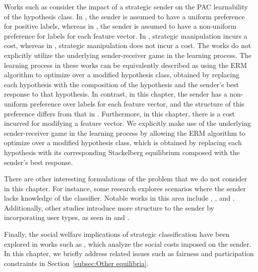 Works such as \cite{hardt2016strategic,cullina2018pac,zhang2021incentive,sundaram2021pac} consider the impact of a strategic sender on the PAC learnability of the hypothesis class. In \cite{hardt2016strategic,cullina2018pac,zhang2021incentive}, the sender is assumed to have a uniform preference for positive labels, whereas in \cite{sundaram2021pac}, the sender is assumed to have a non-uniform preference for labels for each feature vector. In \cite{hardt2016strategic,cullina2018pac,sundaram2021pac}, strategic manipulation incurs a cost, whereas in \cite{zhang2021incentive}, strategic manipulation does not incur a cost. The works \cite{hardt2016strategic,cullina2018pac,zhang2021incentive,sundaram2021pac} do not explicitly utilize the underlying sender-receiver game in the learning process. The learning process in these works can be equivalently described as using the ERM algorithm to optimize over a modified hypothesis class, obtained by replacing each hypothesis with the composition of the hypothesis and the sender's best response to that hypothesis. In contrast, in this chapter, the sender has a non-uniform preference over labels for each feature vector, and the structure of this preference differs from that in \cite{sundaram2021pac}. Furthermore, in this chapter, there is a cost incurred for modifying a feature vector. We explicitly make use of the underlying sender-receiver game in the learning process by allowing the ERM algorithm to optimize over a modified hypothesis class, which is obtained by replacing each hypothesis with its corresponding Stackelberg equilibrium composed with the sender's best response.

There are other interesting formulations of the problem that we do not consider in this chapter. For instance, some research explores scenarios where the sender lacks knowledge of the classifier. Notable works in this area include \cite{ghalme2021strategic}, \cite{bechavod2022information}, and \cite{cohen2024bayesian}. Additionally, other studies introduce more structure to the sender by incorporating user types, as seen in \cite{jagadeesan2021alternative} and \cite{levanon2022generalized}.

Finally, the social welfare implications of strategic classification have been explored in works such as \cite{milli2019social}, which analyze the social costs imposed on the sender. In this chapter, we briefly address related issues such as fairness and participation constraints in Section~\ref{subsec:Other equilibria}.
